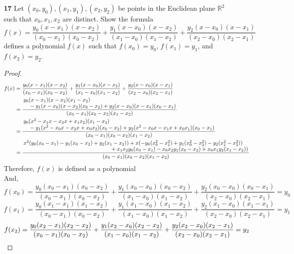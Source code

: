 \documentclass[paper=usletter, fontsize=12pt]{article}
\begin{document}
\begin{itemize}
\begin{enumerate}
\begin{proof}
            \end{proof}

            \item[\textbf{17}] Let $(x_0,y_0),(x_1,y_1),(x_2,y_2)$ be points in
            the Euclidean plane $\mathbb{R}^2$ such that $x_0,x_1,x_2$ are
            distinct. Show the formula
            \begin{equation*}
                f(x)=\frac{y_0(x-x_1)(x-x_2)}{(x_0-x_1)(x_0-x_2)}+\frac{y_1(x-x_0)(x-x_2)}{(x_1-x_0)(x_1-x_2)}+\frac{y_2(x-x_0)(x-x_1)}{(x_2-x_0)(x_2-x_1)}
            \end{equation*}
            defines a polynomial $f(x)$ such that $f(x_0)=y_0$, $f(x_1)=y_1$,
            and $f(x_2)=y_2$.
            \begin{proof}

                \begin{align*}
                    f(x) &= \frac{y_0(x-x_1)(x-x_2)}{(x_0-x_1)(x_0-x_2)}+\frac{y_1(x-x_0)(x-x_2)}{(x_1-x_0)(x_1-x_2)}+\frac{y_2(x-x_0)(x-x_1)}{(x_2-x_0)(x_2-x_1)}\\
                    & = \frac{\splitfrac{y_0(x-x_1)(x-x_2)(x_1-x_2)}{-y_1(x-x_0)(x-x_2)(x_0-x_2)+y_2(x-x_0)(x-x_1)(x_0-x_1)}}{(x_0-x_1)(x_0-x_2)(x_1-x_2)}\\
                    & = \frac{\splitfrac{y_0(x^2-x_1x-x_2x+x_1x_2)(x_1-x_2)}{-y_1(x^2-x_0x-x_2x+x_0x_2)(x_0-x_2)+y_2(x^2-x_0x-x_1x+x_0x_1)(x_0-x_1)}}{(x_0-x_1)(x_0-x_2)(x_1-x_2)}\\
                    & = \frac{\splitfrac{x^2(y_0(x_0-x_1)-y_1(x_0-x_2)+y_2(x_1-x_2))+x(-y_0(x_0^2-x_1^2)+y_1(x_0^2-x_2^2)-y_2(x_1^2-x_2^2))}{+x_1x_2y_0(x_0-x_1)-x_0x_2y_1(x_0-x_2)+x_0x_1y_2(x_1-x_2))}}{(x_0-x_1)(x_0-x_2)(x_1-x_2)}
                \end{align*}
                \endgroup
                Therefore, $f(x)$ is defined as a polynomial\\
                And,
                \begin{equation*}
                    f(x_0)=\frac{y_0(x_0-x_1)(x_0-x_2)}{(x_0-x_1)(x_0-x_2)}+\frac{y_1(x_0-x_0)(x_0-x_2)}{(x_1-x_0)(x_1-x_2)}+\frac{y_2(x_0-x_0)(x_0-x_1)}{(x_2-x_0)(x_2-x_1)}=y_0
                \end{equation*}
                \begin{equation*}
                    f(x_1)=\frac{y_0(x_1-x_1)(x_1-x_2)}{(x_0-x_1)(x_0-x_2)}+\frac{y_1(x_1-x_0)(x_1-x_2)}{(x_1-x_0)(x_1-x_2)}+\frac{y_2(x_1-x_0)(x_1-x_1)}{(x_2-x_0)(x_2-x_1)}=y_1
                \end{equation*}
                \begin{equation*}
                    f(x_2)=\frac{y_0(x_2-x_1)(x_2-x_2)}{(x_0-x_1)(x_0-x_2)}+\frac{y_1(x_2-x_0)(x_2-x_2)}{(x_1-x_0)(x_1-x_2)}+\frac{y_2(x_2-x_0)(x_2-x_1)}{(x_2-x_0)(x_2-x_1)}=y_2 \qedhere
                \end{equation*}


\end{proof}
\end{enumerate}
\end{itemize}
\end{document}
